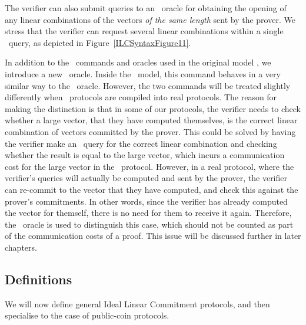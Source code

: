 The verifier can also submit queries to an \ILCopen\ oracle for obtaining the opening of any linear combinations of the vectors \emph{of the same length} sent by the prover. We stress that the verifier can request several linear combinations within a single \ILCopen\ query, as depicted in Figure~\ref{ILCSyntaxFigure11}.

In addition to the \ILC\ commands and oracles used in the original model \cite{BootleCGGHJ17}, we introduce a new \ILCcheck\ oracle. Inside the \ILC \ model, this command behaves in a very similar way to the \ILCopen\ oracle. However, the two commands will be treated slightly differently when \ILC\ protocols are compiled into real protocols. The reason for making the distinction is that in some of our protocols, the verifier needs to check whether a large vector, that they have computed themselves, is the correct linear combination of vectors committed by the prover. This could be solved by having the verifier make an \ILCsend\ query for the correct linear combination and checking whether the result is equal to the large vector, which incurs a communication cost for the large vector in the \ILC\ protocol. However, in a real protocol, where the verifier's queries will actually be computed and sent by the prover, the verifier can re-commit to the vector that they have computed, and check this against the prover's commitments. In other words, since the verifier has already computed the vector for themself, there is no need for them to receive it again. Therefore, the \ILCcheck\ oracle is used to distinguish this case, which should not be counted as part of the communication costs of a proof. This issue will be discussed further in later chapters.

\subsection{Definitions}

We will now define general Ideal Linear Commitment protocols, and then specialise to the case of public-coin protocols.

